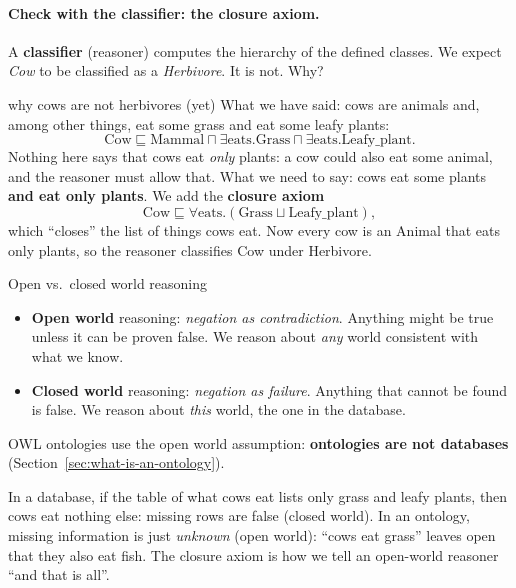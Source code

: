 \paragraph{Check with the classifier: the closure axiom.}
A \textbf{classifier} (reasoner) computes the hierarchy of the defined classes. We expect
\emph{Cow} to be classified as a \emph{Herbivore}. It is not. Why?

\begin{nbexample}{why cows are not herbivores (yet)}
What we have said: cows are animals and, among other things, eat some grass and eat some
leafy plants:
\[
  \text{Cow} \sqsubseteq \text{Mammal} \sqcap \exists\text{eats.Grass} \sqcap
  \exists\text{eats.Leafy\_plant}.
\]
Nothing here says that cows eat \emph{only} plants: a cow could also eat some animal,
and the reasoner must allow that. What we need to say: cows eat some plants
\textbf{and eat only plants}. We add the \textbf{closure axiom}
\[
  \text{Cow} \sqsubseteq \forall\text{eats.}(\text{Grass} \sqcup \text{Leafy\_plant}),
\]
which ``closes'' the list of things cows eat. Now every cow is an Animal that eats only
plants, so the reasoner classifies Cow under Herbivore.
\end{nbexample}

\begin{nbdef}{Open vs.\ closed world reasoning}
\begin{itemize}[nosep]
  \item \textbf{Open world} reasoning: \emph{negation as contradiction}. Anything might
        be true unless it can be proven false. We reason about \emph{any} world
        consistent with what we know.
  \item \textbf{Closed world} reasoning: \emph{negation as failure}. Anything that cannot
        be found is false. We reason about \emph{this} world, the one in the database.
\end{itemize}
OWL ontologies use the open world assumption: \textbf{ontologies are not databases}
(Section~\ref{sec:what-is-an-ontology}).
\end{nbdef}

\begin{nbintuition}
In a database, if the table of what cows eat lists only grass and leafy plants, then cows
eat nothing else: missing rows are false (closed world). In an ontology, missing
information is just \emph{unknown} (open world): ``cows eat grass'' leaves open that they
also eat fish. The closure axiom is how we tell an open-world reasoner ``and that is
all''.
\end{nbintuition}

